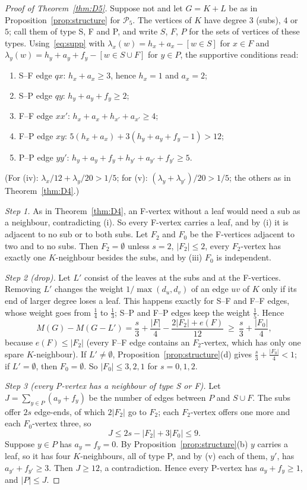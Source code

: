 \documentclass[11pt]{amsart}
\theoremstyle{definition}
\begin{document}
\begin{proof}[Proof of Theorem~\ref{thm:D5}]
Suppose not and let $G=K+L$ be as in Proposition~\ref{prop:structure} for $\mathcal P_5$. The vertices of $K$ have
degree $3$ (subs), $4$ or $5$; call them of type S, F and P, and write $S$, $F$, $P$ for the sets of vertices
of these types. Using~\eqref{eq:supp} with
$\lambda_x(w)=h_x+a_x-[w\in S]$ for $x\in F$ and $\lambda_y(w)=h_y+a_y+f_y-[w\in S\cup F]$ for $y\in P$, the
supportive conditions read:
\begin{enumerate}[label=(\roman*)]
\item S--F edge $qx$: $h_x+a_x\ge3$, hence $h_x=1$ and $a_x=2$;
\item S--P edge $qy$: $h_y+a_y+f_y\ge2$;
\item F--F edge $xx'$: $h_x+a_x+h_{x'}+a_{x'}\ge4$;
\item F--P edge $xy$: $5(h_x+a_x)+3(h_y+a_y+f_y-1)>12$;
\item P--P edge $yy'$: $h_y+a_y+f_y+h_{y'}+a_{y'}+f_{y'}\ge5$.
\end{enumerate}
(For (iv): $\lambda_x/12+\lambda_y/20>1/5$; for (v): $(\lambda_y+\lambda_{y'})/20>1/5$; the others as in
Theorem~\ref{thm:D4}.)

\emph{Step 1.} As in Theorem~\ref{thm:D4}, an F-vertex without a leaf would need a sub as a neighbour, contradicting
(i). So every F-vertex carries a leaf, and by (i) it is adjacent to no sub or to both subs. Let $F_2$ and $F_0$ be the
F-vertices adjacent to two and to no subs. Then $F_2=\emptyset$ unless $s=2$, $|F_2|\le2$, every $F_2$-vertex has
exactly one $K$-neighbour besides the subs, and by (iii) $F_0$ is independent.

\emph{Step 2 (drop).} Let $L'$ consist of the leaves at the subs and at the F-vertices. Removing $L'$ changes the
weight $1/\max(d_u,d_v)$ of an edge $uv$ of $K$ only if its end of larger degree loses a leaf. This happens exactly
for S--F and F--F edges, whose weight goes from $\frac14$ to $\frac13$; S--P and F--P edges keep the weight $\frac15$.
Hence
\[
M(G)-M(G-L')=\frac s3+\frac{|F|}4-\frac{2|F_2|+e(F)}{12}\ \ge\ \frac s3+\frac{|F_0|}4,
\]
because $e(F)\le|F_2|$ (every F--F edge contains an $F_2$-vertex, which has only one spare $K$-neighbour). If
$L'\ne\emptyset$, Proposition~\ref{prop:structure}(d) gives $\frac s3+\frac{|F_0|}4<1$; if $L'=\emptyset$, then
$F_0=\emptyset$. So $|F_0|\le3,2,1$ for $s=0,1,2$.

\emph{Step 3 (every P-vertex has a neighbour of type S or F).} Let
$J=\sum_{y\in P}(a_y+f_y)$ be the number of edges between $P$ and $S\cup F$. The subs offer $2s$ edge-ends, of which
$2|F_2|$ go to $F_2$; each $F_2$-vertex offers one more and each $F_0$-vertex three, so
\[ J\le 2s-|F_2|+3|F_0|\le 9 .\]
Suppose $y\in P$ has $a_y=f_y=0$. By Proposition~\ref{prop:structure}(b) $y$ carries a leaf, so it has four
$K$-neighbours, all of type P, and by (v) each of them, $y'$, has $a_{y'}+f_{y'}\ge3$. Then $J\ge12$, a contradiction.
Hence every P-vertex has $a_y+f_y\ge1$, and $|P|\le J$.


\end{proof}
\end{document}
